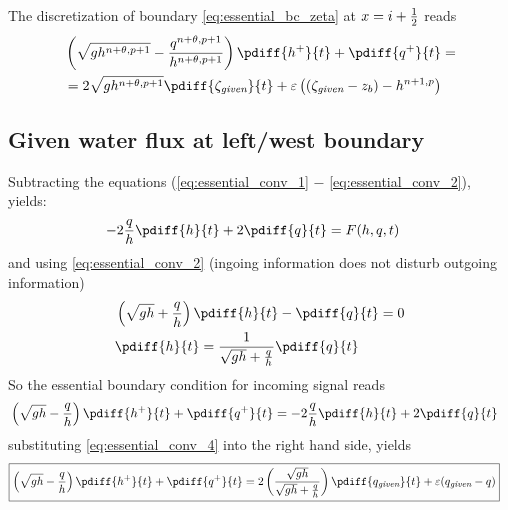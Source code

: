 The discretization of  boundary \autoref{eq:essential_bc_zeta} at $x=i+\frac{1}{2}$ reads
\begin{align}
    &\left(\sqrt{gh^{n+\theta,p+1}} - \frac{q^{n+\theta,p+1}}{h^{n+\theta,p+1}}\right) \pdiff{h^{+}}{t} + \pdiff{q^{+}}{t}  =
    \nonumber \\*
    & = 2 \sqrt{gh^{n+\theta,p+1}} \pdiff{\zeta_{\textit{given}}}{t}
    + \eps \left( (\zeta_{\textit{given}} -z_b) - h^{n+1,p}   \right)
\end{align}

%
\subsection*{Given water flux at left/west boundary}
Subtracting the equations (\eqref{eq:essential_conv_1} $-$ \eqref{eq:essential_conv_2}), yields:
\begin{align}
    - 2 \frac{q}{h}\pdiff{h}{t}  + 2 \pdiff{q}{t} & =  F(h, q, t)
\end{align}
and using \autoref{eq:essential_conv_2} (ingoing information does not disturb outgoing information)
\begin{align}
    &\left(\sqrt{gh} + \frac{q}{h}\right) \pdiff{h}{t} - \pdiff{q}{t}  =0
    \\
    & \pdiff{h}{t}   =
    \frac{1}{\sqrt{gh} + \frac{q}{h}}\pdiff{q}{t}
\end{align}
So the essential boundary condition for incoming signal reads
\begin{align}
    & \left(\sqrt{gh} - \frac{q}{h}\right) \pdiff{h^{+}}{t} + \pdiff{q^{+}}{t} =
    - 2 \frac{q}{h}\pdiff{h}{t}  + 2 \pdiff{q}{t}
\end{align}
substituting \autoref{eq:essential_conv_4} into the right hand side, yields
\begin{align}
&{\boxed{
    \left(\sqrt{gh} - \frac{q}{h}\right) \pdiff{h^{+}}{t} + \pdiff{q^{+}}{t} =
    2 \left( \frac{\sqrt{gh}}{\sqrt{gh} + \frac{q}{h}} \right)\pdiff{q_{\textit{given}}}{t} + \eps(q_{\textit{given}} - q)
}}\label{eq:essential_bc_q}
\end{align}

